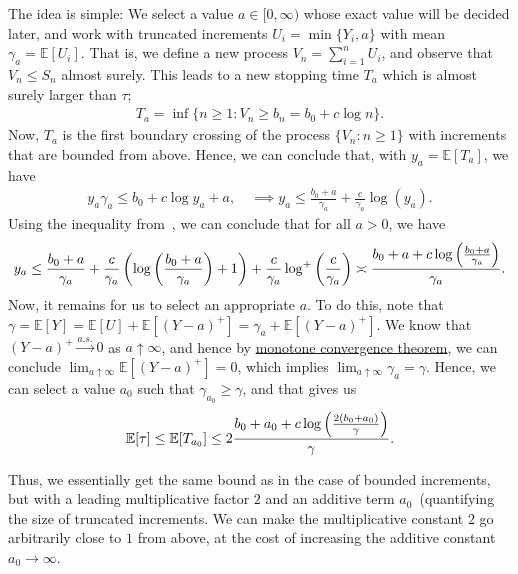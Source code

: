 \documentclass[12pt]{article}
\begin{document}
The idea is simple: We select a value $a \in [0, \infty)$ whose exact value will be decided later, and work with truncated increments $U_i = \min \{Y_i, a\}$ with mean $\gamma_a = \mathbb{E}[U_i]$. That is, we define a new process $V_n = \sum_{i=1}^n U_i$, and observe that $V_n \leq S_n$ almost surely. This leads to a new stopping time $T_a$ which is almost surely larger than $\tau$; 
\begin{align}
    T_a = \inf \{n \geq 1: V_n \geq b_n = b_0 + c \log n\}. 
\end{align}
Now, $T_a$ is the first boundary crossing of the process $\{V_n: n \geq 1\}$ with increments that are bounded from above. Hence, we can conclude that, with $y_a = \mathbb{E}[T_a]$, we have 
\begin{align}
    y_a \gamma_a \leq b_0 + c \log y_a + a, \quad \implies y_a \leq \frac{b_0 + a}{\gamma_a} + \frac{c}{\gamma_a} \log (y_a). 
\end{align}
Using the inequality from~, we can conclude that for all $a>0$, we have 
\begin{align}
    y_a \leq \frac{b_0+ a}{\gamma_a} + \frac{c}{\gamma_a} \left( \log \left( \frac{b_0 + a}{\gamma_a} \right)  + 1\right) + \frac{c}{\gamma_a} \log^+\left( \frac{c}{\gamma_a} \right)  \asymp \frac{b_0 + a + c \log\left( \frac{b_0 + a}{\gamma_a} \right)}{\gamma_a}. 
\end{align}
Now, it remains for us to select an appropriate $a$. To do this, note that $\gamma = \mathbb{E}[Y] = \mathbb{E}[U] + \mathbb{E}[(Y-a)^+] = \gamma_a + \mathbb{E}[(Y-a)^+]$. We know that $(Y-a)^+ \overset{a.s.}{\to} 0$ as $a \uparrow \infty$, and hence by \href{https://en.wikipedia.org/wiki/Monotone_convergence_theorem}{monotone convergence theorem}, we can conclude $\lim_{a \uparrow \infty} \mathbb{E}[(Y-a)^+] = 0$, which implies $\lim_{a \uparrow \infty} \gamma_a = \gamma$.  Hence, we can select a value $a_0$ such that $\gamma_{a_0} \geq \gamma$, and that gives us 
\begin{align}
    \mathbb{E}[\tau] \leq \mathbb{E}[T_{a_0}] \leq 2\frac{b_0 + a_0 + c \log \left( \frac{2(b_0 + a_0)}{\gamma} \right)}{\gamma}. 
\end{align}
\begin{remark}
Thus, we essentially get the same bound as in the case of bounded increments, but with a leading multiplicative factor $2$ and an additive term $a_0$~(quantifying the size of truncated increments. We can make the  multiplicative constant $2$ go arbitrarily close to $1$ from above, at the cost of increasing the additive constant $a_0 \to \infty$. 
\end{remark}
\end{document}

